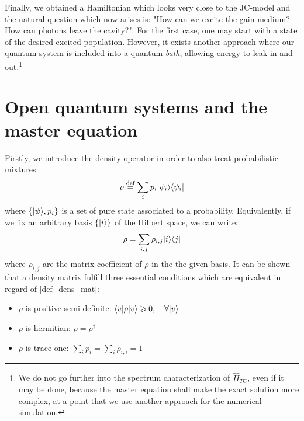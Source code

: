 \documentclass[11pt]{report}
\DeclarePairedDelimiter\bra{\langle}{\rvert}
\DeclarePairedDelimiter\ket{\lvert}{\rangle}
\begin{document}
Finally, we obtained a Hamiltonian which looks very close to the JC-model and the natural question which now arises is: "How can we excite the gain medium? How can photons leave the cavity?". For the first case, one may start with a state of the desired excited population. However, it exists another approach where our quantum system is included into a quantum \textit{bath}, allowing energy to leak in and out.\footnote{We do not go further into the spectrum characterization of $\hat{H}_{TC}$, even if it may be done, because the master equation shall make the exact solution more complex, at a point that we use another approach for the numerical simulation.}

\section{Open quantum systems and the master equation}

Firstly, we introduce the density operator in order to also treat probabilistic mixtures:
\begin{equation}
\label{def_dens_mat}
\rho \stackrel{\text{def}}{=} \sum_i p_i \ket{\psi_i}\bra{\psi_i}
\end{equation}
where $\left\lbrace \ket{\psi}, p_i \right\rbrace$ is a set of pure state associated to a probability. Equivalently, if we fix an arbitrary basis $\left\lbrace \ket{i} \right\rbrace$ of the Hilbert space, we can write:
\begin{equation}
\label{deftwo_dens_mat}
\rho = \sum_{i,j} \rho_{i,j} \ket{i}\bra{j}
\end{equation}
where $\rho_{i,j}$ are the matrix coefficient of $\rho$ in the the given basis. It can be shown that a density matrix fulfill three essential conditions which are equivalent in regard of \eqref{def_dens_mat}:
\begin{itemize}
	\item $\rho$ is positive semi-definite: $\bra{v} \rho \ket{v} \geqslant 0, \quad \forall \ket{v}$
	\item $\rho$ is hermitian: $\rho = \rho^\dagger$
	\item $\rho$ is trace one: $\sum_i p_i = \sum_i \rho_{i, i} = 1$
\end{itemize}
\end{document}
